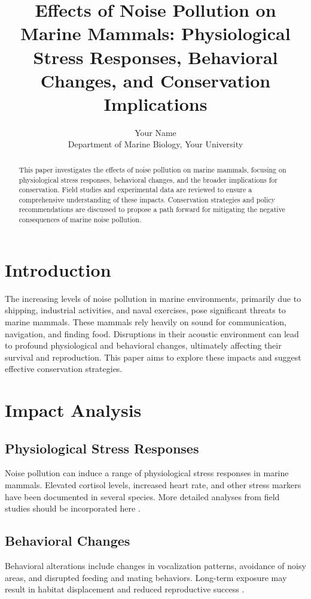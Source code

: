 \documentclass[12pt]{article}
\title{Effects of Noise Pollution on Marine Mammals: Physiological Stress Responses, Behavioral Changes, and Conservation Implications}
\author{Your Name \\ Department of Marine Biology, Your University}
\begin{document}
\maketitle

\begin{abstract}
This paper investigates the effects of noise pollution on marine mammals, focusing on physiological stress responses, behavioral changes, and the broader implications for conservation. Field studies and experimental data are reviewed to ensure a comprehensive understanding of these impacts. Conservation strategies and policy recommendations are discussed to propose a path forward for mitigating the negative consequences of marine noise pollution.
\end{abstract}

\section{Introduction}
The increasing levels of noise pollution in marine environments, primarily due to shipping, industrial activities, and naval exercises, pose significant threats to marine mammals. These mammals rely heavily on sound for communication, navigation, and finding food. Disruptions in their acoustic environment can lead to profound physiological and behavioral changes, ultimately affecting their survival and reproduction. This paper aims to explore these impacts and suggest effective conservation strategies.

\section{Impact Analysis}
\subsection{Physiological Stress Responses}
Noise pollution can induce a range of physiological stress responses in marine mammals. Elevated cortisol levels, increased heart rate, and other stress markers have been documented in several species. More detailed analyses from field studies should be incorporated here \citep{SampleFieldStudy2020}.

\subsection{Behavioral Changes}
Behavioral alterations include changes in vocalization patterns, avoidance of noisy areas, and disrupted feeding and mating behaviors. Long-term exposure may result in habitat displacement and reduced reproductive success \citep{ExperimentalStudy2021}.
\end{document}
